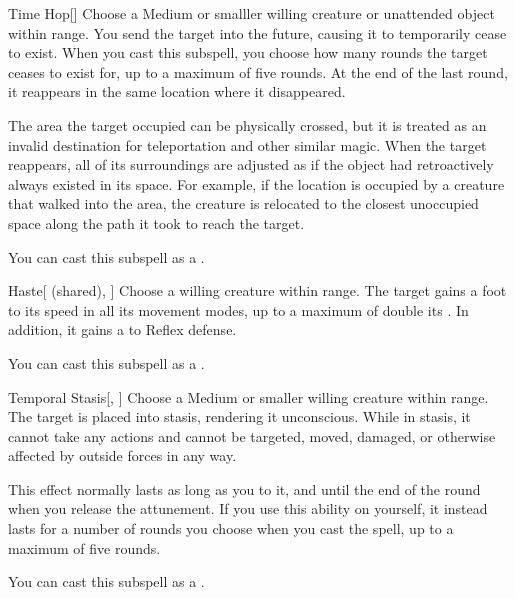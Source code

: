\begin{ability}[\nth{2}]{Time Hop}[]
Choose a Medium or smalller willing creature or unattended object within \rngmed range.
You send the target into the future, causing it to temporarily cease to exist.
When you cast this subspell, you choose how many rounds the target ceases to exist for, up to a maximum of five rounds.
At the end of the last round, it reappears in the same location where it disappeared.

The area the target occupied can be physically crossed, but it is treated as an invalid destination for teleportation and other similar magic.
When the target reappears, all of its surroundings are adjusted as if the object had retroactively always existed in its space.
For example, if the location is occupied by a creature that walked into the area, the creature is relocated to the closest unoccupied space along the path it took to reach the target.

You can cast this subspell as a .
\end{ability}
\vspace{0.25em}


\begin{ability}[\nth{3}]{Haste}[ (shared), ]
Choose a willing creature within \rngmed range.
The target gains a  foot  to its speed in all its movement modes, up to a maximum of double its .
In addition, it gains a   to Reflex defense.

You can cast this subspell as a .
\end{ability}
\vspace{0.25em}


\begin{ability}[\nth{3}]{Temporal Stasis}[, ]
Choose a Medium or smaller willing creature within \rngmed range.
The target is placed into stasis, rendering it unconscious.
While in stasis, it cannot take any actions and cannot be targeted, moved, damaged, or otherwise affected by outside forces in any way.

This effect normally lasts as long as you  to it, and until the end of the round when you release the attunement.
If you use this ability on yourself, it instead lasts for a number of rounds you choose when you cast the spell, up to a maximum of five rounds.

You can cast this subspell as a .
\end{ability}
\vspace{0.25em}


